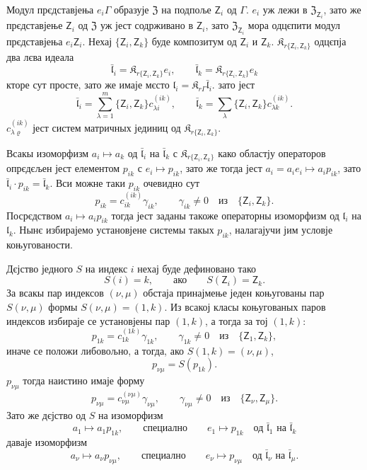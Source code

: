 \documentclass[11pt]{article}
\begin{document}
Модул прєдставјења \(e_i\Gamma\) образује \(\mathfrak Z\) на подпоље \(\mathsf{Z}_i\) од \(\Gamma\). \(e_i\) уж лежи в \(\mathfrak Z_{\mathsf{Z}_i}\), зато же прєдставјење \(\mathsf{Z}_i\) од \(\mathfrak Z\) уж јест содрживано в \(\mathsf{Z}_i\), зато \(\mathfrak Z_{\mathsf{Z}_i}\) мора одцєпити модул прєдставјења \(e_i\mathsf{Z}_i\). Нехај \(\{\mathsf{Z}_i,\mathsf{Z}_k\}\) буде композитум од \(\mathsf{Z}_i\) и \(\mathsf{Z}_k\). \(\mathfrak K_{r\{\mathsf{Z}_i,\mathsf{Z}_k\}}\) одцєпја два лєва идеала
\[
\bar{\mathfrak l}_i=\mathfrak K_{r\{\mathsf{Z}_i,\mathsf{Z}_k\}}e_i,\qquad
\bar{\mathfrak l}_k=\mathfrak K_{r\{\mathsf{Z}_i,\mathsf{Z}_k\}}e_k
\]
кторе сут просте, зато же имаје мєсто \(\mathfrak l_i=\mathfrak K_{r\Gamma}\bar{\mathfrak l}_i\). зато јест
\[
\bar{\mathfrak l}_i=\sum_{\lambda=1}^m\{\mathsf{Z}_i,\mathsf{Z}_k\}c_{\lambda i}^{(ik)},\qquad
\bar{\mathfrak l}_k=\sum_{\lambda}\{\mathsf{Z}_i,\mathsf{Z}_k\}c_{\lambda k}^{(ik)}.
\]
\(c_{\lambda\varrho}^{(ik)}\) јест систем матричных јединиц од \(\mathfrak K_{r\{\mathsf{Z}_i,\mathsf{Z}_k\}}\).

Всакы изоморфизм \(a_i\mapsto a_k\) од \(\bar{\mathfrak l}_i\) на \(\bar{\mathfrak l}_k\) с \(\mathfrak K_{r\{\mathsf{Z}_i,\mathsf{Z}_k\}}\) како областју операторов опрєдєљен јест елементом \(p_{ik}\) с \(e_i\mapsto p_{ik}\), зато же тогда јест \(a_i=a_ie_i\mapsto a_ip_{ik}\), зато \(\bar{\mathfrak l}_i\cdot p_{ik}=\bar{\mathfrak l}_k\). Вси можне таки \(p_{ik}\) очевидно сут
\[
p_{ik}=c_{ik}^{(ik)}\gamma_{ik},\qquad \gamma_{ik}\ne0\quad\text{из}\quad \{\mathsf{Z}_i,\mathsf{Z}_k\}.
\]
Посрєдством \(a_i\mapsto a_ip_{ik}\) тогда јест заданы такоже операторны изоморфизм од \(\mathfrak l_i\) на \(\mathfrak l_k\). Нынє избирајемо установјене системы такых \(p_{ik}\), налагајучи јим условје коњугованости.

Дєјство једного \(S\) на индекс \(i\) нехај буде дефиновано тако
\[
S(i)=k,\qquad\text{ако}\qquad S(\mathsf{Z}_i)=\mathsf{Z}_k.
\]
За всакы пар индексов \((\nu,\mu)\) обстаја принајмење једен коњугованы пар \(S(\nu,\mu)\) формы \(S(\nu,\mu)=(1,k)\). Из всакој класы коњугованых паров индексов избираје се установјены пар \((1,k)\), а тогда за тој \((1,k)\):
\[
p_{1k}=c_{1k}^{(1k)}\gamma_{1k},\qquad \gamma_{1k}\ne0\quad\text{из}\quad \{\mathsf{Z}_1,\mathsf{Z}_k\},
\]
иначе се положи либовољно, а тогда, ако \(S(1,k)=(\nu,\mu)\),
\[
p_{\nu\mu}=S(p_{1k}).
\]
\(p_{\nu\mu}\) тогда наистино имаје форму
\[
p_{\nu\mu}=c_{\nu\mu}^{(\nu\mu)}\gamma_{\nu\mu},\qquad
\gamma_{\nu\mu}\ne0\quad\text{из}\quad \{\mathsf{Z}_\nu,\mathsf{Z}_\mu\}.
\]
Зато же дєјство од \(S\) на изоморфизм
\[
a_1\mapsto a_1p_{1k},\qquad\text{специално}\qquad e_1\mapsto p_{1k}
\quad\text{од }\bar{\mathfrak l}_1\text{ на }\bar{\mathfrak l}_k
\]
даваје изоморфизм
\[
a_\nu\mapsto a_\nu p_{\nu\mu},\qquad\text{специално}\qquad e_\nu\mapsto p_{\nu\mu}
\quad\text{од }\bar{\mathfrak l}_\nu\text{ на }\bar{\mathfrak l}_\mu.
\]
\end{document}
